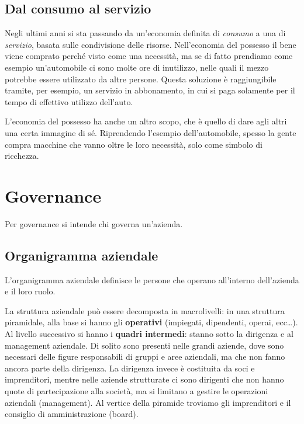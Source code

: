 \section{Dal consumo al servizio} 

Negli ultimi anni si sta passando da un'economia definita di \textit{consumo} a
una di \textit{servizio}, basata sulle condivisione delle risorse.
Nell'economia del possesso il bene viene comprato perché visto come una
necessità, ma se di fatto prendiamo come esempio un'automobile ci sono molte ore
di inutilizzo, nelle quali il mezzo potrebbe essere utilizzato da altre persone.
Questa soluzione è raggiungibile tramite, per esempio, un servizio in
abbonamento, in cui si paga solamente per il tempo di effettivo utilizzo
dell'auto.

L'economia del possesso ha anche un altro scopo, che è quello di dare agli altri
una certa immagine di sé. Riprendendo l'esempio dell'automobile, spesso la gente
compra macchine che vanno oltre le loro necessità, solo come simbolo di
ricchezza.


\chapter{Governance}

Per governance si intende chi governa un'azienda.

\section{Organigramma aziendale}
\begin{definition}
L'organigramma aziendale definisce le persone che operano all'interno
dell'azienda e il loro ruolo.
\end{definition}

\noindent La struttura aziendale può essere decomposta in macrolivelli: in una
struttura piramidale, alla base si hanno gli \textbf{operativi} (impiegati,
dipendenti, operai, ecc\dots). Al livello successivo si hanno i \textbf{quadri
intermedi}: stanno sotto la dirigenza e al management aziendale. Di solito sono
presenti nelle grandi aziende, dove sono necessari delle figure responsabili di
gruppi e aree aziendali, ma che non fanno ancora parte della dirigenza. La
dirigenza invece è costituita da soci e imprenditori, mentre nelle aziende
strutturate ci sono dirigenti che non hanno quote di partecipazione alla
società, ma si limitano a gestire le operazioni aziendali (management). Al
vertice della piramide troviamo gli imprenditori e il consiglio di
amministrazione (board).

